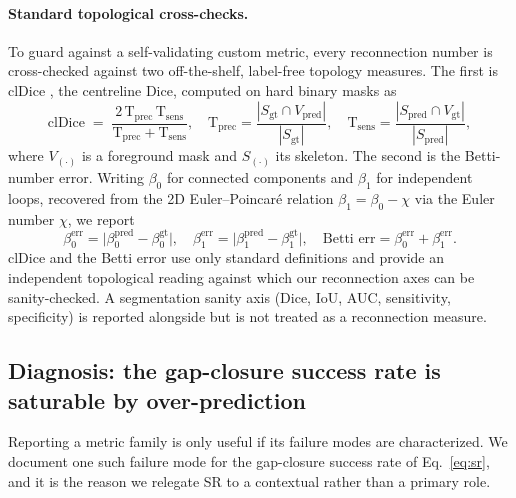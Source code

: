 \paragraph{Standard topological cross-checks.} To guard against a
self-validating custom metric, every reconnection number is cross-checked
against two off-the-shelf, label-free topology measures. The first is clDice
\cite{TODO_cldice}, the centreline Dice, computed on hard binary masks as
\begin{equation}
  \mathrm{clDice}
  \;=\;
  \frac{2\,\mathrm{T_{prec}}\,\mathrm{T_{sens}}}
       {\mathrm{T_{prec}} + \mathrm{T_{sens}}},
  \quad
  \mathrm{T_{prec}} = \frac{|S_{\text{gt}}\cap V_{\text{pred}}|}{|S_{\text{gt}}|},
  \quad
  \mathrm{T_{sens}} = \frac{|S_{\text{pred}}\cap V_{\text{gt}}|}{|S_{\text{pred}}|},
  \label{eq:cldice}
\end{equation}
where $V_{(\cdot)}$ is a foreground mask and $S_{(\cdot)}$ its skeleton. The
second is the Betti-number error. Writing $\beta_0$ for connected components
and $\beta_1$ for independent loops, recovered from the 2D
Euler--Poincar\'e relation $\beta_1 = \beta_0 - \chi$ via the Euler number
$\chi$, we report
\begin{equation}
  \beta_0^{\text{err}} = \bigl|\beta_0^{\text{pred}}-\beta_0^{\text{gt}}\bigr|,
  \quad
  \beta_1^{\text{err}} = \bigl|\beta_1^{\text{pred}}-\beta_1^{\text{gt}}\bigr|,
  \quad
  \text{Betti err} = \beta_0^{\text{err}} + \beta_1^{\text{err}}.
  \label{eq:betti}
\end{equation}
clDice and the Betti error use only standard definitions and provide an
independent topological reading against which our reconnection axes can be
sanity-checked. A segmentation sanity axis (Dice, IoU, AUC, sensitivity,
specificity) is reported alongside but is not treated as a reconnection
measure.

\subsection{Diagnosis: the gap-closure success rate is saturable by
over-prediction}
\label{sec:benchmark:srdiag}

Reporting a metric family is only useful if its failure modes are
characterized. We document one such failure mode for the gap-closure success
rate of Eq.~\eqref{eq:sr}, and it is the reason we relegate SR to a contextual
rather than a primary role.


